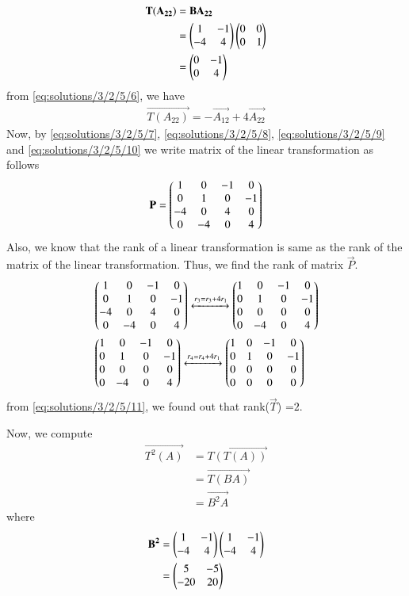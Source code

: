 \begin{align}  
	\mathbf{T(A_{22})} & = \mathbf{BA_{22}} \\
	& = \begin{pmatrix}1 & -1 \\ -4 & 4\end{pmatrix}\begin{pmatrix}0 & 0 \\ 0 & 1\end{pmatrix} \\
	& = \begin{pmatrix}0 & -1 \\ 0 & 4\end{pmatrix} \label{eq:solutions/3/2/5/6}
\end{align}
from \eqref{eq:solutions/3/2/5/6}, we have
\begin{align}
	\vec{T(A_{22})} = -\vec{A_{12}} + 4\vec{A_{22}}\label{eq:solutions/3/2/5/10}
\end{align}
Now, by \eqref{eq:solutions/3/2/5/7}, \eqref{eq:solutions/3/2/5/8}, \eqref{eq:solutions/3/2/5/9} and \eqref{eq:solutions/3/2/5/10} we write matrix of the linear transformation as follows
\begin{align}
\mathbf{P} = \begin{pmatrix}1 & 0 & -1 & 0 \\ 0 & 1 & 0 & -1 \\ -4 & 0 & 4 & 0 \\ 0 & -4 & 0 & 4 \end{pmatrix}
\end{align}
Also, we know that the rank of a linear transformation is same as the rank of the matrix of the linear transformation. Thus, we find the rank of matrix $\vec{P}$.
\begin{align}
& \begin{pmatrix}1 & 0 & -1 & 0 \\ 0 & 1 & 0 & -1 \\ -4 & 0 & 4 & 0 \\ 0 & -4 & 0 & 4\end{pmatrix}\xleftrightarrow[]{r_3= r_3 + 4r_1}  \begin{pmatrix}1 & 0 & -1 & 0 \\ 0 & 1 & 0 & -1 \\ 0 & 0 & 0 & 0 \\ 0 & -4 & 0 & 4 \end{pmatrix} \\
& \begin{pmatrix}1 & 0 & -1 & 0 \\ 0 & 1 & 0 & -1 \\ 0 & 0 & 0 & 0 \\ 0 & -4 & 0 & 4 \end{pmatrix} \xleftrightarrow[]{r_4 = r_4 + 4r_1}\begin{pmatrix}1 & 0 & -1 & 0 \\ 0 & 1 & 0 & -1 \\ 0 & 0 & 0 & 0 \\ 0 & 0 & 0 & 0 \end{pmatrix} \label{eq:solutions/3/2/5/11}
\end{align}
from \eqref{eq:solutions/3/2/5/11}, we found out that rank($\vec{T}$) =$2$.

Now, we compute
\begin{align}
\vec{T^2(A)} & = \vec{T(T(A))} \\
             & = \vec{T(BA)} \\
             & = \vec{B^2A}
\end{align}
where
\begin{align}
\mathbf{B^2} & = \begin{pmatrix}1 & -1 \\ -4 & 4\end{pmatrix}\begin{pmatrix}1 & -1 \\ -4 & 4\end{pmatrix} \\
          & = \begin{pmatrix}5 & -5 \\ -20 & 20\end{pmatrix}
\end{align}
